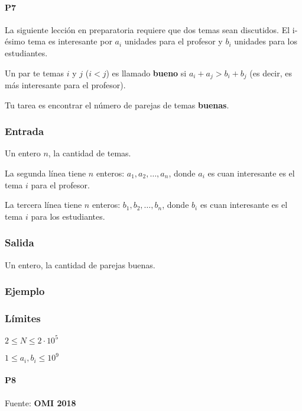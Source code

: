 \problembreak
 
 \paragraph{P7} La siguiente lección en preparatoria requiere que dos temas sean discutidos. El i-ésimo tema es interesante por \(a_i\) unidades para el profesor y \(b_i\) unidades para los estudiantes.
 
 Un par te temas \(i\) y \(j\) (\(i<j\)) es llamado \textbf{bueno} si \(a_i+a_j > b_i+b_j\) (es decir, es más interesante para el profesor).
 
 Tu tarea es encontrar el número de parejas de temas \textbf{buenas}.
 \subsubsection*{Entrada}
 Un entero \(n\), la cantidad de temas.
 
 La segunda línea tiene \(n\) enteros: \(a_1,a_2,\ldots, a_n\), donde \(a_i\) es cuan interesante es el tema \(i\) para el profesor.
 
 La tercera línea tiene \(n\) enteros: \(b_1,b_2,\ldots, b_n\), donde \(b_i\) es cuan interesante es el tema \(i\) para los estudiantes.
 
 \subsubsection*{Salida}
 Un entero, la cantidad de parejas buenas.
 
 \subsubsection*{Ejemplo}
 \begin{casebox2}
 \end{casebox2}

\subsubsection*{Límites}
\begin{plimits}
	\item \(2\leq N\leq 2\cdot 10^5\)
	\item \(1\leq a_i, b_i\leq  10^9\)
\end{plimits}
 \codeforces
 
 

\problembreak

 \paragraph{P8} 
 
 Fuente: \textbf{OMI 2018}
 

\problembreak
